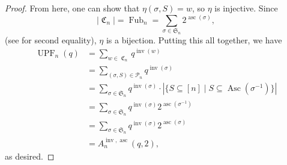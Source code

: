 \documentclass{amsart}
\renewcommand{\S}{\mathfrak{S}}
\DeclareMathOperator{\asc}{asc}
\DeclareMathOperator{\Asc}{Asc}
\DeclareMathOperator{\inv}{inv}
\DeclareMathOperator{\UPF}{UPF} %
\DeclareMathOperator{\Fub}{Fub}
\DeclareMathOperator{\C}{\mathfrak{C}}
\theoremstyle{definition}
\begin{document}
\begin{proof}
    From here, one can show that $\eta(\sigma,S)=w$, so $\eta$ is injective. Since 
    \[|\C_n|=\Fub_n=\sum_{\sigma\in \S_n}2^{\asc(\sigma)},\]
    (see \cite[p.~269, eqn.~(6.39)]{GKP} for second equality), $\eta$ is a bijection. Putting this all together, we have 
    \begin{align*}
    \UPF_n(q)&=\sum_{w\in \C_n}q^{\inv(w)}\\
    &=\sum_{(\sigma,S)\in \mathcal{P}_n}q^{\inv(\sigma)}\\
    &=\sum_{\sigma\in \mathfrak{S}_n}q^{\inv(\sigma)}\cdot |\{S\subseteq[n]\mid S\subseteq \Asc(\sigma^{-1})\}|\\
    &=\sum_{\sigma\in \mathfrak{S}_n}q^{\inv(\sigma)}2^{\asc(\sigma^{-1})}\\
    &=\sum_{\sigma\in \mathfrak{S}_n}q^{\inv(\sigma)}2^{\asc(\sigma)}\\
    &=A_n^{\inv,\asc}(q,2),
    \end{align*}
    as desired.
\end{proof}
\end{document}
